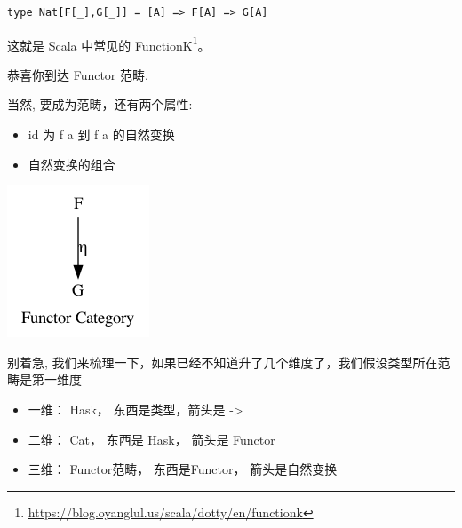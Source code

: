 \documentclass[letterspacing]{tufte-book}
\begin{document}
\lstset{language=scala,label= ,caption= ,captionpos=b,numbers=none}
\begin{lstlisting}
type Nat[F[_],G[_]] = [A] => F[A] => G[A]
\end{lstlisting}

这就是 Scala 中常见的 FunctionK\footnote{\url{https://blog.oyanglul.us/scala/dotty/en/functionk}}。

恭喜你到达 Functor 范畴.

当然, 要成为范畴，还有两个属性:
\begin{itemize}
\item id 为 f a 到 f a 的自然变换
\item 自然变换的组合
\end{itemize}

\begin{center}
\includegraphics[width=.9\linewidth]{images/functor-category.png}
\end{center}

别着急, 我们来梳理一下，如果已经不知道升了几个维度了，我们假设类型所在范畴是第一维度
\begin{itemize}
\item 一维： Hask， 东西是类型，箭头是 ->
\item 二维： Cat， 东西是 Hask， 箭头是 Functor
\item 三维： Functor范畴， 东西是Functor， 箭头是自然变换
\end{itemize}
\end{document}
